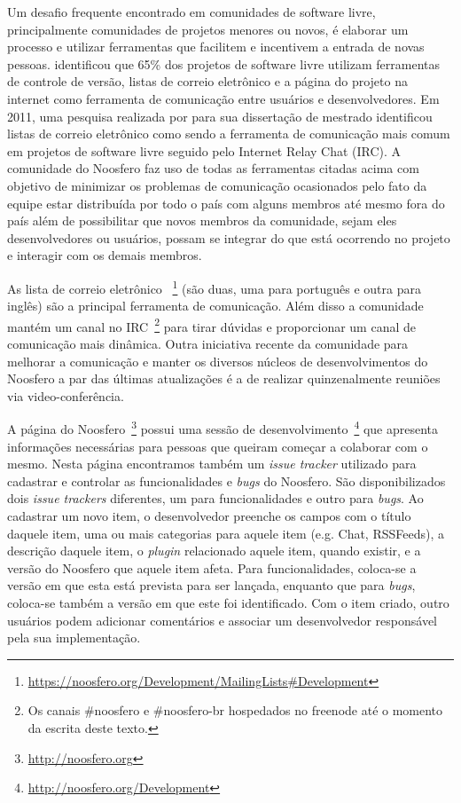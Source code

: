 Um desafio frequente encontrado em comunidades de software livre, principalmente
comunidades de projetos menores ou novos, é elaborar um processo e utilizar
ferramentas que facilitem e incentivem a entrada de novas pessoas. 
 identificou que 65\% dos projetos de software livre
utilizam ferramentas de controle de versão, listas de correio eletrônico e a
página do projeto na internet como ferramenta de comunicação entre usuários e
desenvolvedores. Em 2011, uma pesquisa realizada por 
para sua dissertação de mestrado identificou listas de correio eletrônico como
sendo a ferramenta de comunicação mais comum em projetos de software livre
seguido pelo Internet Relay Chat (IRC).
%
A comunidade do Noosfero faz uso de todas as ferramentas citadas acima com
objetivo de minimizar  os problemas de comunicação ocasionados pelo fato da
equipe estar distribuída por todo o país com alguns membros até mesmo fora do
país além de possibilitar que novos membros da comunidade, sejam eles
desenvolvedores ou usuários, possam se integrar do que está ocorrendo no
projeto e interagir com os demais membros.

As lista de correio eletrônico
~\footnote{\url{https://noosfero.org/Development/MailingLists\#Development}}
(são duas, uma para português e outra para inglês) são a principal ferramenta
de comunicação. 
%
Além disso a comunidade mantém um canal no IRC~\footnote{Os canais \#noosfero e
\#noosfero-br hospedados no freenode até o momento da escrita deste texto.}
para tirar dúvidas e proporcionar um canal de comunicação mais dinâmica.
%
Outra iniciativa recente da comunidade para melhorar a comunicação e manter os
diversos núcleos de desenvolvimentos do Noosfero a par das últimas atualizações
é a de realizar quinzenalmente reuniões via video-conferência.

A página do Noosfero~\footnote{\url{http://noosfero.org}} possui uma sessão de
desenvolvimento~\footnote{\url{http://noosfero.org/Development}} que apresenta
informações necessárias para pessoas que queiram começar a colaborar com o
mesmo. Nesta página encontramos também um \textit{issue tracker} utilizado para
cadastrar e controlar as funcionalidades e \textit{bugs} do Noosfero.
%
São disponibilizados dois \textit{issue trackers} diferentes, um para
funcionalidades e outro para \textit{bugs}. Ao cadastrar um novo item, o
desenvolvedor preenche os campos com o título daquele item, uma ou mais
categorias para aquele item (e.g. Chat, RSSFeeds), a descrição daquele
item, o \textit{plugin} relacionado aquele item, quando existir, e a
versão do Noosfero que aquele item afeta.
%
Para funcionalidades, coloca-se a
versão em que esta está prevista para ser lançada, enquanto que para
\textit{bugs}, coloca-se também a versão em que este foi identificado. Com o
item criado, outro usuários podem adicionar comentários e associar um
desenvolvedor responsável pela sua implementação.

